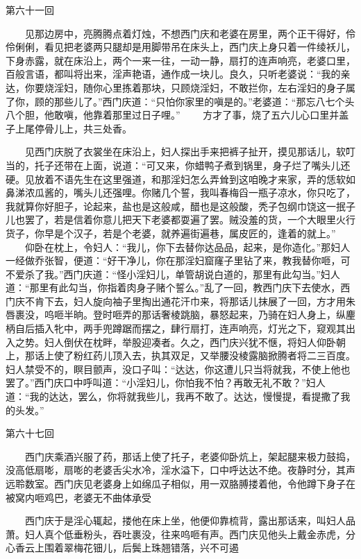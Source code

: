 第六十一回

　　见那边房中，亮腾腾点着灯烛，不想西门庆和老婆在房里，两个正干得好，伶伶俐俐，看见把老婆两只腿却是用脚带吊在床头上，西门庆上身只着一件绫袄儿，下身赤露，就在床沿上，两个一来一往，一动一静，扇打的连声响亮，老婆口里，百般言语，都叫将出来，淫声艳语，通作成一块儿。良久，只听老婆说：“我的亲达，你要烧淫妇，随你心里拣着那块，只顾烧淫妇，不敢拦你，左右淫妇的身子属了你，顾的那些儿了。”西门庆道：“只怕你家里的嗔是的。”老婆道：“那忘八七个头八个胆，他敢嗔，他靠着那里过日子哩。”
　　方才了事，烧了五六儿心口里并盖子上尾停骨儿上，共三处香。


　　见西门庆脱了衣裳坐在床沿上，妇人探出手来把裤子扯开，摸见那话儿，软叮当的，托子还带在上面，说道：“可又来，你蜡鸭子煮到锅里，身子烂了嘴头儿还硬。见放着不语先生在这里强道，和那淫妇怎么弄耸到这咱晚才来家，弄的恁软如鼻涕浓瓜酱的，嘴头儿还强哩。你赌几个誓，我叫春梅舀一瓶子凉水，你只吃了，我就算你好胆子，论起来，盐也是这般咸，醋也是这般酸，秃子包纲巾饶这一抿子儿也罢了，若是信着你意儿把天下老婆都耍遍了罢。贼没羞的货，一个大眼里火行货子，你早是个汉子，若是个老婆，就养遍街遍巷，属皮匠的，逢着的就上。”
　　仰卧在枕上，令妇人：“我儿，你下去替你达品品，起来，是你造化。”那妇人一经做乔张智，便道：“好干净儿，你在那淫妇窟窿子里钻了来，教我替你咂，可不爱杀了我。”西门庆道：“怪小淫妇儿，单管胡说白道的，那里有此勾当。”妇人道：“那里有此勾当，你指着肉身子赌个誓么。”乱了一回，教西门庆下去使水，西门庆不肯下去，妇人旋向袖子里掏出通花汗巾来，将那话儿抹展了一回，方才用朱唇裹没，呜咂半晌。登时咂弄的那话奢棱跳脑，暴怒起来，乃骑在妇人身上，纵麈柄自后插入牝中，两手兜蹲踞而摆之，肆行扇打，连声响亮，灯光之下，窥观其出入之势。妇人倒伏在枕畔，举股迎凑者。久之，西门庆兴犹不惬，将妇人仰卧朝上，那话上使了粉红药儿顶入去，执其双足，又举腰没棱露脑掀腾者将二三百度。妇人禁受不的，瞑目颤声，没口子叫：“达达，你这遭儿只当将就我，不使上他也罢了。”西门庆口中呼叫道：“小淫妇儿，你怕我不怕？再敢无礼不敢？”妇人道：“我的达达，罢么，你将就我些儿，我再不敢了。达达，慢慢提，看提撒了我的头发。”


第六十七回

　　西门庆乘酒兴服了药，那话上使了托子，老婆仰卧炕上，架起腿来极力鼓捣，没高低扇嘭，扇嘭的老婆舌尖水冷，淫水溢下，口中呼达达不绝。夜静时分，其声远聆数室。西门庆见老婆身上如绵瓜子相似，用一双胳膊搂着他，令他蹲下身子在被窝内咂鸡巴，老婆无不曲体承受


　　西门庆于是淫心辄起，搂他在床上坐，他便仰靠梳背，露出那话来，叫妇人品萧。妇人真个低垂粉头，吞吐裹没，往来呜咂有声。西门庆见他头上戴金赤虎，分心香云上围着翠梅花钿儿，后鬓上珠翘错落，兴不可遏


